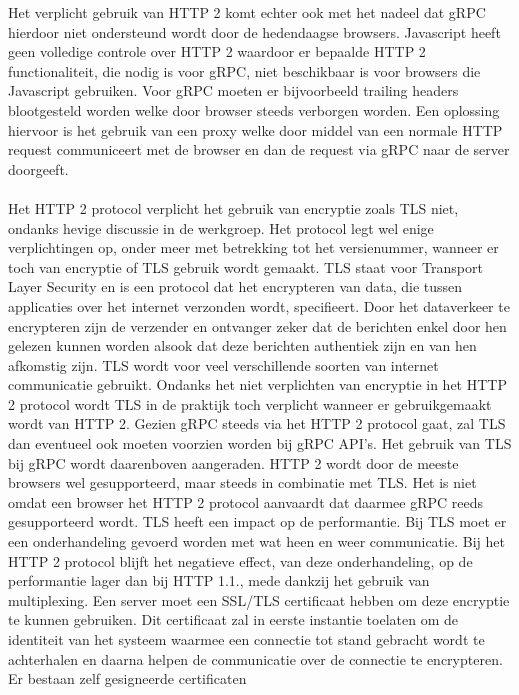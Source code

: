 Het verplicht gebruik van HTTP 2 komt echter ook met het nadeel dat gRPC hierdoor niet ondersteund wordt door de hedendaagse browsers. Javascript heeft geen
volledige controle over HTTP 2 waardoor er bepaalde HTTP 2 functionaliteit, die nodig is voor gRPC, niet beschikbaar is voor browsers die Javascript gebruiken.
Voor gRPC moeten er bijvoorbeeld trailing headers blootgesteld worden welke door browser steeds verborgen worden. Een oplossing hiervoor is het gebruik van een proxy welke
door middel van een normale HTTP request communiceert met de browser en dan de request via gRPC naar de server doorgeeft.\newline
~\autocite{altexsoftgrpc}\\
~\autocite{yukutakahashi}\\

Het HTTP 2 protocol verplicht het gebruik van encryptie zoals TLS niet, ondanks hevige discussie in de werkgroep. Het protocol legt wel enige verplichtingen op,
onder meer met betrekking tot het versienummer, wanneer er toch van encryptie of TLS gebruik wordt gemaakt. TLS staat voor Transport Layer Security en is een protocol
dat het encrypteren van data, die tussen applicaties over het internet verzonden wordt, specifieert. Door het dataverkeer te encrypteren zijn de verzender en ontvanger zeker dat
de berichten enkel door hen gelezen kunnen worden alsook dat deze berichten authentiek zijn en van hen afkomstig zijn. TLS wordt voor veel verschillende soorten van internet communicatie gebruikt.
Ondanks het niet verplichten van encryptie in het HTTP 2 protocol wordt TLS in de praktijk toch verplicht wanneer er gebruikgemaakt wordt van HTTP 2.
Gezien gRPC steeds via het HTTP 2 protocol gaat, zal TLS dan eventueel ook moeten voorzien worden bij gRPC API's. Het gebruik van TLS bij gRPC wordt daarenboven aangeraden.
HTTP 2 wordt door de meeste browsers wel gesupporteerd, maar steeds in combinatie met TLS. Het is niet omdat een browser het HTTP 2 protocol aanvaardt dat daarmee gRPC reeds
gesupporteerd wordt.\newline
TLS heeft een impact op de performantie. Bij TLS moet er een onderhandeling gevoerd worden met wat heen en weer communicatie. Bij het HTTP 2 protocol blijft het
negatieve effect, van deze onderhandeling, op de performantie lager dan bij HTTP 1.1., mede dankzij het gebruik van multiplexing.
Een server moet een SSL/TLS certificaat hebben om deze encryptie te kunnen gebruiken. Dit certificaat zal in eerste instantie toelaten om de identiteit van het systeem
waarmee een connectie tot stand gebracht wordt te achterhalen en daarna helpen de communicatie over de connectie te encrypteren. Er bestaan zelf gesigneerde certificaten
